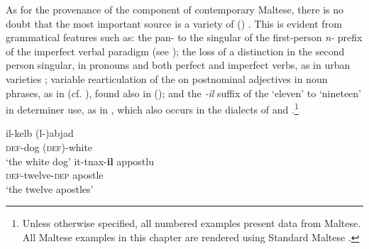 \documentclass[output=paper]{langsci/langscibook}
\begin{document}
As for the provenance of the  component of contemporary Maltese, there is no doubt that the most important source is a variety of  () . This is evident from grammatical features such as: the pan-  to the singular of the first-person \textit{n-} prefix of the imperfect verbal paradigm
(see ); the loss of a  distinction in the second person singular, in pronouns and both perfect and imperfect verbs, as in urban   varieties \citep{Gibson2011}; variable rearticulation of the   on postnominal adjectives in  noun phrases, as in  (cf. \citealt{Gatt2018}), found also in   (\citealt[205]{Harrell2004}); and the \textit{-il} suffix of the  `eleven' to `nineteen' in determiner use, as in , which also occurs in the  dialects of  \citep{Caubet2011} and  \citep{Taine-Cheikh2011numerals}.\footnote{Unless otherwise specified, all numbered examples present data from Maltese. All Maltese examples in this chapter are rendered using  Standard Maltese .}


\begin{table}
\caption{First-person imperfect `write' in Eastern and Western Arabic}
\label{niktib}
\end{table}

\begin{multicols}{2}
\ea\label{ex:optionalarticle}
\gll il-kelb (l-)abjad\\
     \textsc{def}-dog (\textsc{def})-white\\
\glt `the white dog'
\ex\label{ex:apostles}
\gll it-tnax-\textbf{il} appostlu\\
     \textsc{def}-twelve-\textsc{dep} apostle\\
\glt `the twelve apostles'
\z
\end{multicols}
\end{document}
